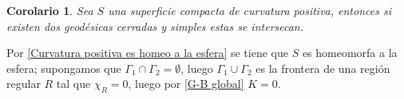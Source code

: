 \documentclass[11pt]{article}
\newtheorem{corollary}[theorem]{Corolario}
\newenvironment{proof}[1][Demostraci\'on]{\begin{trivlist}
		\item[\hskip \labelsep {\bfseries #1}]}{\end{trivlist}}
\newcommand{\qed}{\nobreak \ifvmode \relax \else
	\ifdim\lastskip<1.5em \hskip-\lastskip
	\hskip1.5em plus0em minus0.5em \fi \nobreak
	\vrule height0.75em width0.5em depth0.25em\fi}
\begin{document}
\begin{corollary}
	Sea $S$ una superficie compacta de curvatura positiva, entonces si existen dos geod\'esicas cerradas y simples estas se intersecan.
\end{corollary}

\begin{proof}
	Por \ref{Curvatura positiva es homeo a la esfera} se tiene que $S$ es homeomorfa a la esfera; supongamos que $\Gamma_1 \cap \Gamma_2 = \emptyset$, luego $\Gamma_1 \cup \Gamma_2$ es la frontera de una regi\'on regular $R$ tal que $\chi_R = 0$, luego por \ref{G-B global} $K = 0$. \qed
\end{proof}
\end{document}
